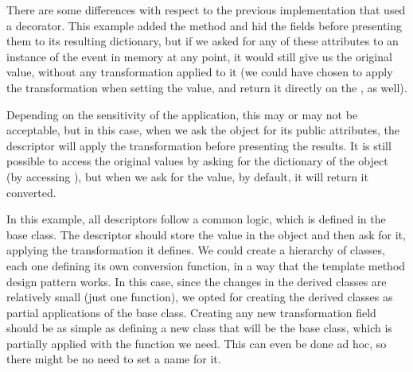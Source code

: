 \documentclass[a4paper,10pt,english]{sphinxmanual}
\begin{document}
\begin{sphinxVerbatim}[commandchars=\\\{\}]
    
\end{sphinxVerbatim}

There are some differences with respect to the previous implementation that used a
decorator. This example added the  method and hid the fields before
presenting them to its resulting dictionary, but if we asked for any of these attributes to an
instance of the event in memory at any point, it would still give us the original value,
without any transformation applied to it (we could have chosen to apply the
transformation when setting the value, and return it directly on the , as well).

Depending on the sensitivity of the application, this may or may not be acceptable, but in
this case, when we ask the object for its public attributes, the descriptor will apply the
transformation before presenting the results. It is still possible to access the original values
by asking for the dictionary of the object (by accessing ), but when we ask for the
value, by default, it will return it converted.

In this example, all descriptors follow a common logic, which is defined in the base class.
The descriptor should store the value in the object and then ask for it, applying the
transformation it defines. We could create a hierarchy of classes, each one defining its own
conversion function, in a way that the template method design pattern works. In this case,
since the changes in the derived classes are relatively small (just one function), we opted for
creating the derived classes as partial applications of the base class. Creating any new
transformation field should be as simple as defining a new class that will be the base class,
which is partially applied with the function we need. This can even be done ad hoc, so there
might be no need to set a name for it.
\end{document}
